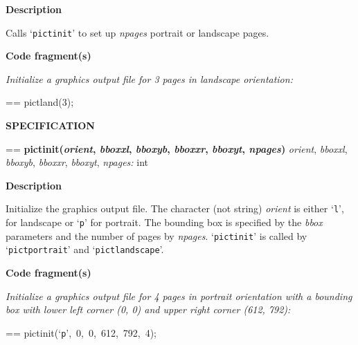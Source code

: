 \documentclass{book}
\makeatletter
\newcommand\Texinfocommandstyletextvar[1]{{\normalfont{}\textsl{#1}}}%
\newenvironment{Texinfopreformatted}{%
  \par\GNUTobeylines\obeyspaces\frenchspacing\parskip=\z@\parindent=\z@}{}
{\catcode`\^^M=13 \gdef\GNUTobeylines{\catcode`\^^M=13 \def^^M{\null\par}}}
\newenvironment{Texinfoindented}{\begin{list}{}{}\item\relax}{\end{list}}
\renewcommand{\_}{\Texinfounderscore\discretionary{}{}{}}
\makeatother
\begin{document}
\noindent{}\textbf{Description}

Calls `\texttt{pict\_init}' to set up \Texinfocommandstyletextvar{npages} portrait or landscape pages.

\noindent{}\textbf{Code fragment(s)}

\emph{Initialize a graphics output file for 3 pages in landscape orientation:}
\begin{Texinfoindented}
\begin{Texinfopreformatted}%
\ttfamily pict\_land(3);
\end{Texinfopreformatted}
\end{Texinfoindented}

\noindent{}\textbf{SPECIFICATION}
\begin{Texinfoindented}
\begin{Texinfopreformatted}%
\textbf{pict\_init(\Texinfocommandstyletextvar{orient}, \Texinfocommandstyletextvar{bboxxl}, \Texinfocommandstyletextvar{bboxyb}, \Texinfocommandstyletextvar{bboxxr}, \Texinfocommandstyletextvar{bboxyt}, \Texinfocommandstyletextvar{npages})}
\Texinfocommandstyletextvar{orient}, \Texinfocommandstyletextvar{bboxxl}, \Texinfocommandstyletextvar{bboxyb}, \Texinfocommandstyletextvar{bboxxr}, \Texinfocommandstyletextvar{bboxyt}, \Texinfocommandstyletextvar{npages:} int
\end{Texinfopreformatted}
\end{Texinfoindented}
%
%
%
%
%
%

\noindent{}\textbf{Description}

Initialize the graphics output file.
The character (not string)
\Texinfocommandstyletextvar{orient} is either `\texttt{l}', for landscape or `\texttt{p}' for portrait.
The bounding box is specified by the \Texinfocommandstyletextvar{bbox}
parameters and the number of pages by \Texinfocommandstyletextvar{npages}.
`\texttt{pict\_init}' is called by `\texttt{pict\_portrait}' and `\texttt{pict\_landscape}'.

\noindent{}\textbf{Code fragment(s)}

\emph{Initialize a graphics output file for 4 pages in portrait orientation with
a bounding box with lower left corner (0, 0) and upper right corner
(612, 792):}
\begin{Texinfoindented}
\begin{Texinfopreformatted}%
\ttfamily pict\_init(`\texttt{p}',\ 0,\ 0,\ 612,\ 792,\ 4);
\end{Texinfopreformatted}
\end{Texinfoindented}
\end{document}
